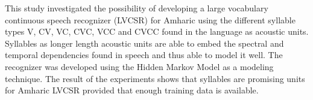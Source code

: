 This study investigated the possibility of developing a large vocabulary continuous speech recognizer (LVCSR) for Amharic using the different syllable types V, CV, VC, CVC, VCC and CVCC found in the language as acoustic units. Syllables as longer length acoustic units are able to embed the spectral and temporal dependencies found in speech and thus able to model it well. The recognizer was developed using the Hidden Markov Model as a modeling technique. The result of the experiments shows that syllables are promising units for Amharic LVCSR provided that enough training data is available.
